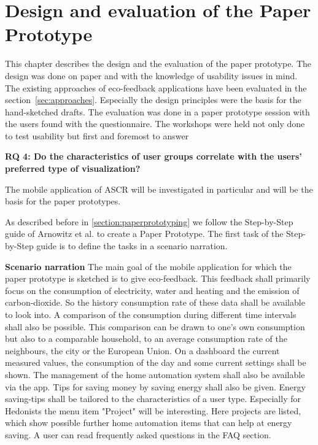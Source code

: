\chapter{Design and evaluation of the Paper Prototype}


This chapter describes the design and the evaluation of the paper prototype. The design was done on paper and with the knowledge of usability issues in mind. The existing approaches of eco-feedback applications have been evaluated in the section~\ref{sec:approaches}. Especially the design principles were the basis for the hand-sketched drafts. The evaluation was done in a paper prototype session with the users found with the questionnaire. The workshops were held not only done to test usability but first and foremost to answer 

\textbf{RQ 4: Do the characteristics of user groups correlate with the users' preferred type of visualization?}

The mobile application of ASCR will be investigated in particular and will be the basis for the paper prototypes.

As described before in \ref{section:paperprototyping} we follow the Step-by-Step guide of Arnowitz et al. \cite{arnowitz2010effective} to create a Paper Prototype. The first task of the Step-by-Step guide is to define the tasks in a scenario narration.

\textbf{Scenario narration} The main goal of the mobile application for which the paper prototype is sketched is to give eco-feedback. This feedback shall primarily focus on the consumption of electricity, water and heating and the emission of carbon-dioxide. So the history consumption rate of these data shall be available to look into. A comparison of the consumption during different time intervals shall also be possible. This comparison can be drawn to one's own consumption but also to a comparable household, to an average consumption rate of the neighbours, the city or the European Union. On a dashboard the current measured values, the consumption of the day and some current settings shall be shown. The management of the home automation system shall also be available via the app. Tips for saving money by saving energy shall also be given. Energy saving-tips shall be tailored to the characteristics of a user type. Especially for Hedonists the menu item "Project" will be interesting. Here projects are listed, which show possible further home automation items that can help at energy saving. A user can read frequently asked questions in the FAQ section.

